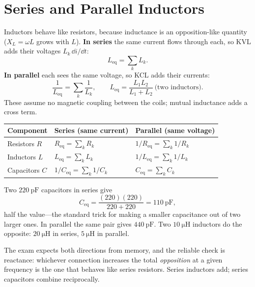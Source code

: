 \section{Series and Parallel Inductors}
Inductors behave like resistors, because inductance is an opposition-like quantity
(\(X_L=\omega L\) grows with \(L\)). \textbf{In series} the same current flows
through each, so KVL adds their voltages \(L_k\,\dd i/\dd t\):
\[
L_{\mathrm{eq}}=\sum_k L_k .
\]
\textbf{In parallel} each sees the same voltage, so KCL adds their currents:
\[
\frac{1}{L_{\mathrm{eq}}}=\sum_k\frac{1}{L_k},
\qquad
L_{\mathrm{eq}}=\frac{L_1L_2}{L_1+L_2}\ \text{(two inductors)}.
\]
These assume no magnetic coupling between the coils; mutual inductance adds a cross
term.

\begin{center}
\begin{tabularx}{\textwidth}{@{}L{0.17\textwidth}Y Y@{}}
\toprule
Component & Series (same current) & Parallel (same voltage) \\
\midrule
Resistors \(R\) & \(R_{\mathrm{eq}}=\sum_k R_k\) & \(1/R_{\mathrm{eq}}=\sum_k 1/R_k\) \\
Inductors \(L\) & \(L_{\mathrm{eq}}=\sum_k L_k\) & \(1/L_{\mathrm{eq}}=\sum_k 1/L_k\) \\
Capacitors \(C\) & \(1/C_{\mathrm{eq}}=\sum_k 1/C_k\) & \(C_{\mathrm{eq}}=\sum_k C_k\) \\
\bottomrule
\end{tabularx}
\end{center}

\begin{workedbox}
Two \(\SI{220}{\pico\farad}\) capacitors in series give
\[
C_{\mathrm{eq}}=\frac{(220)(220)}{220+220}=\SI{110}{\pico\farad},
\]
half the value---the standard trick for making a smaller capacitance out of two
larger ones. In parallel the same pair gives \(\SI{440}{\pico\farad}\). Two
\(\SI{10}{\micro\henry}\) inductors do the opposite: \(\SI{20}{\micro\henry}\) in
series, \(\SI{5}{\micro\henry}\) in parallel.
\end{workedbox}

\begin{exambox}
The exam expects both directions from memory, and the reliable check is
reactance: whichever connection increases the total \emph{opposition} at a given
frequency is the one that behaves like series resistors. Series inductors add;
series capacitors combine reciprocally.
\end{exambox}

